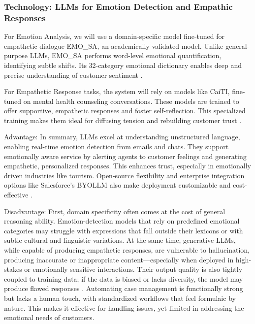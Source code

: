 \subsubsection{Technology: LLMs for Emotion Detection and Empathic Responses}

For Emotion Analysis, we will use a domain-specific model fine-tuned for empathetic dialogue EMO\_SA, an academically validated model. Unlike general-purpose LLMs, EMO\_SA performs word-level emotional quantification, identifying subtle shifts. Its 32-category emotional dictionary enables deep and precise understanding of customer sentiment \cite{chen2023}. 

For Empathetic Response tasks, the system will rely on models like CaiTI, fine-tuned on mental health counseling conversations. These models are trained to offer supportive, empathetic responses and foster self-reflection. This specialized training makes them ideal for diffusing tension and rebuilding customer trust \cite{nie2025}.

Advantage: In summary, LLMs excel at understanding unstructured language, enabling real-time emotion detection from emails and chats. They support emotionally aware service by alerting agents to customer feelings and generating empathetic, personalized responses. This enhances trust, especially in emotionally driven industries like tourism. Open-source flexibility and enterprise integration options like Salesforce's BYOLLM also make deployment customizable and cost-effective \cite{salesforce2025}.

Disadvantage: First, domain specificity often comes at the cost of general reasoning ability. Emotion-detection models that rely on predefined emotional categories may struggle with expressions that fall outside their lexicons or with subtle cultural and linguistic variations. At the same time, generative LLMs, while capable of producing empathetic responses, are vulnerable to hallucination, producing inaccurate or inappropriate content—especially when deployed in high-stakes or emotionally sensitive interactions. Their output quality is also tightly coupled to training data; if the data is biased or lacks diversity, the model may produce flawed responses \cite{xi2023rise}. Automating case management is functionally strong but lacks a human touch, with standardized workflows that feel formulaic by nature. This makes it effective for handling issues, yet limited in addressing the emotional needs of customers.
